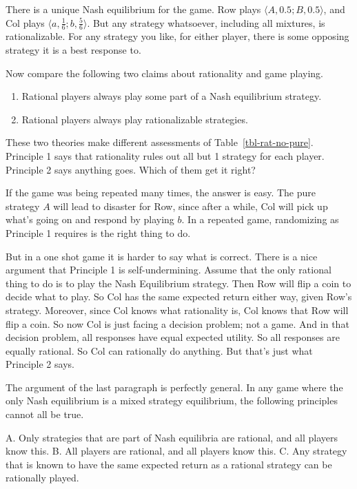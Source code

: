 \documentclass[
  11pt,
  letterpaper,
]{scrbook}
\providecommand{\tightlist}{%
  \setlength{\itemsep}{0pt}\setlength{\parskip}{0pt}}
\begin{document}
There is a unique Nash equilibrium for the game. Row plays
\(\langle A, 0.5; B, 0.5 \rangle\), and Col plays
\(\langle a, \frac{1}{6}; b, \frac{5}{6} \rangle\). But any strategy
whatsoever, including all mixtures, is rationalizable. For any strategy
you like, for either player, there is some opposing strategy it is a
best response to.

Now compare the following two claims about rationality and game playing.

\begin{enumerate}
\def\labelenumi{\arabic{enumi}.}
\tightlist
\item
  Rational players always play some part of a Nash equilibrium strategy.
\item
  Rational players always play rationalizable strategies.
\end{enumerate}

These two theories make different assessments of
Table~\ref{tbl-rat-no-pure}. Principle 1 says that rationality rules out
all but 1 strategy for each player. Principle 2 says anything goes.
Which of them get it right?

If the game was being repeated many times, the answer is easy. The pure
strategy \(A\) will lead to disaster for Row, since after a while, Col
will pick up what's going on and respond by playing \(b\). In a repeated
game, randomizing as Principle 1 requires is the right thing to do.

But in a one shot game it is harder to say what is correct. There is a
nice argument that Principle 1 is self-undermining. Assume that the only
rational thing to do is to play the Nash Equilibrium strategy. Then Row
will flip a coin to decide what to play. So Col has the same expected
return either way, given Row's strategy. Moreover, since Col knows what
rationality is, Col knows that Row will flip a coin. So now Col is just
facing a decision problem; not a game. And in that decision problem, all
responses have equal expected utility. So all responses are equally
rational. So Col can rationally do anything. But that's just what
Principle 2 says.

The argument of the last paragraph is perfectly general. In any game
where the only Nash equilibrium is a mixed strategy equilibrium, the
following principles cannot all be true.

A. Only strategies that are part of Nash equilibria are rational, and
all players know this. B. All players are rational, and all players know
this. C. Any strategy that is known to have the same expected return as
a rational strategy can be rationally played.
\end{document}
